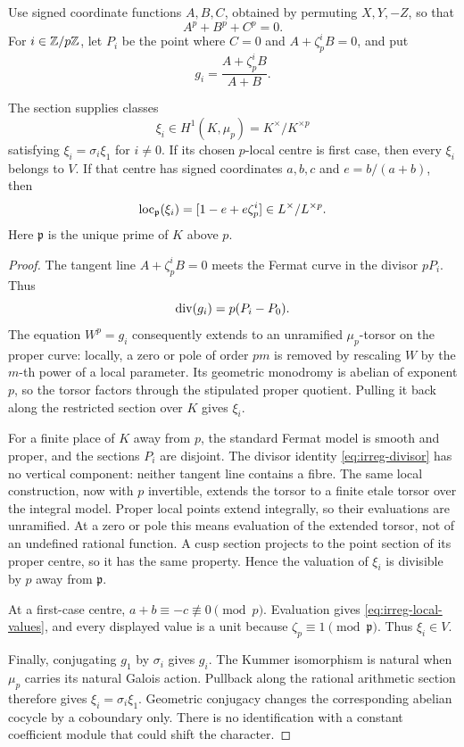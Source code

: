 Use signed coordinate functions \(A,B,C\), obtained by permuting
\(X,Y,-Z\), so that
\[
 A^p+B^p+C^p=0.
\]
For \(i\in\mathbb Z/p\mathbb Z\), let \(P_i\) be the point where \(C=0\) and
\(A+\zeta_p^iB=0\), and put
\[
 g_i=\frac{A+\zeta_p^iB}{A+B}.
\]

\begin{lemma}\label{lem:irreg-proper-torsors}
The section supplies classes
\[
 \xi_i\in H^1(K,\mu_p)=K^\times/K^{\times p}
\]
satisfying \(\xi_i=\sigma_i\xi_1\) for \(i\neq0\).
If its chosen \(p\)-local centre is first case, then every \(\xi_i\)
belongs to \(V\). If that centre has signed coordinates \(a,b,c\) and
\(e=b/(a+b)\), then
\begin{equation}
 \operatorname{loc}_{\mathfrak p}(\xi_i)
  =[1-e+e\zeta_p^i]\in L^\times/L^{\times p}.
 \label{eq:irreg-local-values}
\end{equation}
Here \(\mathfrak p\) is the unique prime of \(K\) above \(p\).
\end{lemma}

\begin{proof}
The tangent line \(A+\zeta_p^iB=0\) meets the Fermat curve in the
divisor \(pP_i\). Thus
\begin{equation}
 \operatorname{div}(g_i)=p(P_i-P_0).
 \label{eq:irreg-divisor}
\end{equation}
The equation \(W^p=g_i\) consequently extends to an unramified
\(\mu_p\)-torsor on the proper curve: locally, a zero or pole of
order \(pm\) is removed by rescaling \(W\) by the \(m\)-th power of a
local parameter. Its geometric monodromy is abelian of exponent \(p\),
so the torsor factors through the stipulated proper quotient. Pulling
it back along the restricted section over \(K\) gives \(\xi_i\).

For a finite place of \(K\) away from \(p\), the standard Fermat model
is smooth and proper, and the sections \(P_i\) are disjoint. The
divisor identity \eqref{eq:irreg-divisor} has no vertical component:
neither tangent line contains a fibre. The same local construction,
now with \(p\) invertible, extends the torsor to a finite etale torsor
over the integral model. Proper local points extend integrally, so
their evaluations are unramified. At a zero or pole this means
evaluation of the extended torsor, not of an undefined rational
function. A cusp section projects to the point section of its
proper centre, so it has the same property. Hence the valuation of
\(\xi_i\) is divisible by \(p\) away from \(\mathfrak p\).

At a first-case centre, \(a+b\equiv-c\not\equiv0\pmod p\).
Evaluation gives \eqref{eq:irreg-local-values}, and every displayed
value is a unit because \(\zeta_p\equiv1\pmod{\mathfrak p}\). Thus
\(\xi_i\in V\).

Finally, conjugating \(g_1\) by \(\sigma_i\) gives \(g_i\). The Kummer
isomorphism is natural when \(\mu_p\) carries its natural Galois
action. Pullback along the rational arithmetic section therefore
gives \(\xi_i=\sigma_i\xi_1\). Geometric conjugacy changes the
corresponding abelian cocycle by a coboundary only. There is no
identification with a constant coefficient module that could shift
the character.
\end{proof}

